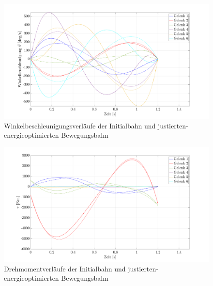 %
\begin{figure}[tbph]
	\centering
	\includegraphics[width=1\linewidth]{images/Optimierungsergebnisse_up/accoptfinal}
	\caption{Winkelbeschleunigungsverläufe der Initialbahn und justierten-energieoptimierten Bewegungsbahn}
	\label{fig:accoptfinal}
\end{figure}
%
%
\begin{figure}[tbph]
	\centering
	\includegraphics[width=1\linewidth]{images/Optimierungsergebnisse_up/tauoptfinal}
	\caption{Drehmomentverläufe der Initialbahn und justierten-energieoptimierten Bewegungsbahn}
	\label{fig:tauoptfinal}
\end{figure}
